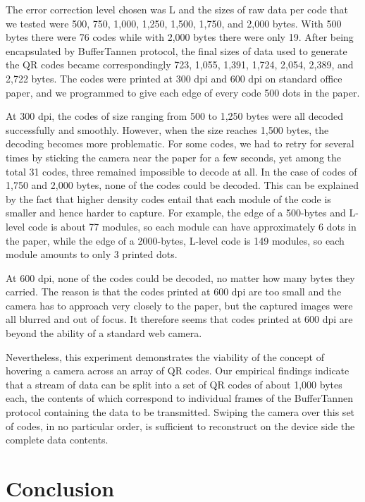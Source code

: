 The error correction level chosen was L and the sizes of raw data per code that we tested were 500, 750, 1,000, 1,250, 1,500, 1,750, and 2,000 bytes. With 500 bytes there were 76 codes while with 2,000 bytes there were only 19. After being encapsulated by BufferTannen protocol, the final sizes of data used to generate the QR codes became correspondingly 723, 1,055, 1,391, 1,724, 2,054, 2,389, and 2,722 bytes. The codes were printed at 300 dpi and 600 dpi on standard office paper, and we programmed to give each edge of every code 500 dots in the paper.

At 300 dpi, the codes of size ranging from 500 to 1,250 bytes were all decoded successfully and smoothly. However, when the size reaches 1,500 bytes, the decoding becomes more problematic. For some codes, we had to retry for several times by sticking the camera near the paper for a few seconds, yet among the total 31 codes, three remained impossible to decode at all. In the case of codes of 1,750 and 2,000 bytes, none of the codes could be decoded. This can be explained by the fact that higher density codes entail that each module of the code is smaller and hence harder to capture. For example, the edge of a 500-bytes and L-level code is about 77 modules, so each module can have approximately 6 dots in the paper, while the edge of a 2000-bytes, L-level code is 149 modules, so each module amounts to only 3 printed dots.

At 600 dpi, none of the codes could be decoded, no matter how many bytes they carried. The reason is that the codes printed at 600 dpi are too small and the camera has to approach very closely to the paper, but the captured images were all blurred and out of focus. It therefore seems that codes printed at 600 dpi are beyond the ability of a standard web camera.

Nevertheless, this experiment demonstrates the viability of the concept of hovering a camera across an array of QR codes. Our empirical findings indicate that a stream of data can be split into a set of QR codes of about 1,000 bytes each, the contents of which correspond to individual frames of the BufferTannen protocol containing the data to be transmitted. Swiping the camera over this set of codes, in no particular order, is sufficient to reconstruct on the device side the complete data contents.


\section{Conclusion}\label{sec:qr:conclusion} %

